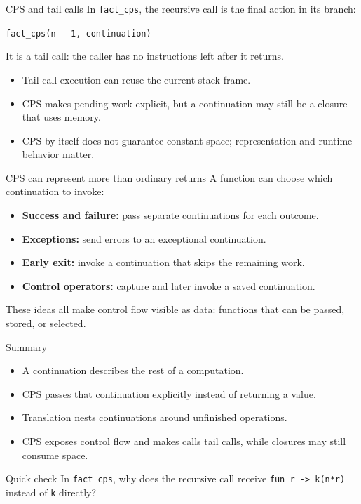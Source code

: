 \documentclass[aspectratio=169,10pt]{beamer}
\begin{document}
\begin{frame}{CPS and tail calls}
  In \texttt{fact\_cps}, the recursive call is the final action in its branch:
  \begin{center}
    \texttt{fact\_cps(n - 1, continuation)}
  \end{center}
  It is a tail call: the caller has no instructions left after it returns.
  \begin{itemize}
    \item Tail-call execution can reuse the current stack frame.
    \item CPS makes pending work explicit, but a continuation may still be a closure that uses memory.
    \item CPS by itself does not guarantee constant space; representation and runtime behavior matter.
  \end{itemize}
\end{frame}

\begin{frame}{CPS can represent more than ordinary returns}
  A function can choose which continuation to invoke:
  \begin{itemize}
    \item \textbf{Success and failure:} pass separate continuations for each outcome.
    \item \textbf{Exceptions:} send errors to an exceptional continuation.
    \item \textbf{Early exit:} invoke a continuation that skips the remaining work.
    \item \textbf{Control operators:} capture and later invoke a saved continuation.
  \end{itemize}
  These ideas all make control flow visible as data: functions that can be
  passed, stored, or selected.
\end{frame}

\begin{frame}{Summary}
  \begin{itemize}
    \item A continuation describes the rest of a computation.
    \item CPS passes that continuation explicitly instead of returning a value.
    \item Translation nests continuations around unfinished operations.
    \item CPS exposes control flow and makes calls tail calls, while closures may still consume space.
  \end{itemize}
  \vspace{1em}
  \begin{block}{Quick check}
    In \texttt{fact\_cps}, why does the recursive call receive
    \texttt{fun r -> k(n*r)} instead of \texttt{k} directly?
  \end{block}
\end{frame}
\end{document}
